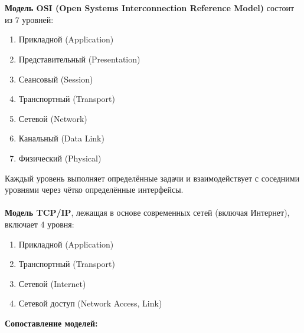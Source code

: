 \documentclass[a4paper, 12pt]{report}
\numberwithin{equation}{section}
\begin{document}
\\\\
\textbf{Модель OSI (Open Systems Interconnection Reference Model)} состоит из 7 уровней:
\begin{enumerate}
	\item Прикладной (Application)
	\item Представительный (Presentation)
	\item Сеансовый (Session)
	\item Транспортный (Transport)
	\item Сетевой (Network)
	\item Канальный (Data Link)
	\item Физический (Physical)
\end{enumerate}
Каждый уровень выполняет определённые задачи и взаимодействует с соседними уровнями через чётко определённые интерфейсы.
\\\\
\textbf{Модель TCP/IP}, лежащая в основе современных сетей (включая Интернет), включает 4 уровня:
\begin{enumerate}
	\item Прикладной (Application)
	\item Транспортный (Transport)
	\item Сетевой (Internet)
	\item Сетевой доступ (Network Access, Link)
\end{enumerate}
\textbf{Сопоставление моделей:}
\end{document}
